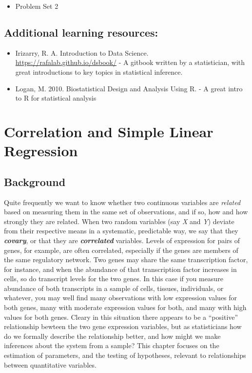 \documentclass[
]{book}
\providecommand{\tightlist}{%
  \setlength{\itemsep}{0pt}\setlength{\parskip}{0pt}}
\begin{document}
\begin{itemize}
\tightlist
\item
  Problem Set 2
\end{itemize}

\hypertarget{additional-learning-resources-4}{%
\section{Additional learning resources:}\label{additional-learning-resources-4}}

\begin{itemize}
\item
  Irizarry, R. A. Introduction to Data Science. \url{https://rafalab.github.io/dsbook/} - A gitbook written by a statistician, with great introductions to key topics in statistical inference.
\item
  Logan, M. 2010. Biostatistical Design and Analysis Using R. - A great intro to R for statistical analysis
\end{itemize}

\hypertarget{correlation-and-simple-linear-regression}{%
\chapter{Correlation and Simple Linear Regression}\label{correlation-and-simple-linear-regression}}

\hypertarget{background-3}{%
\section{Background}\label{background-3}}

Quite frequently we want to know whether two continuous variables are \emph{related} based on measuring them in the same set of observations, and if so, how and how strongly they are related. When two random variables (say \emph{X} and \emph{Y}) deviate from their respective means in a systematic, predictable way, we say that they \textbf{\emph{covary}}, or that they are \textbf{\emph{correlated}} variables. Levels of expression for pairs of genes, for example, are often correlated, especially if the genes are members of the same regulatory network. Two genes may share the same transcription factor, for instance, and when the abundance of that transcription factor increases in cells, so do transcript levels for the two genes. In this case if you measure abundance of both transcripts in a sample of cells, tissues, individuals, or whatever, you may well find many observations with low expression values for both genes, many with moderate expression values for both, and many with high values for both genes. Cleary in this situation there appears to be a ``positive'' relationship bewteen the two gene expression variables, but as statisticians how do we formally describe the relationship better, and how might we make inferences about the system from a sample? This chapter focuses on the estimation of parameters, and the testing of hypotheses, relevant to relationships between quantitative variables.
\end{document}
